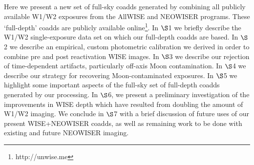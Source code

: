 \documentclass{emulateapj}
\begin{document}
Here we present a new set of full-sky coadds generated by
combining all publicly available W1/W2 exposures from the AllWISE and NEOWISER
programs. These `full-depth' coadds are publicly available 
online\footnote{http://unwise.me}. In $\S$1 we briefly describe the W1/W2 
single-exposure data set on which our full-depth coadds are based. In $\S$2
we describe an empirical, custom photometric calibration we derived in order 
to combine pre and post reactivation WISE images. In $\S$3 we describe our
rejection of time-dependent artifacts, particularly off-axis Moon 
contamination. In $\S$4 we describe our strategy for recovering 
Moon-contaminated exposures. In $\S$5 we highlight some important aspects 
of the full-sky set of full-depth coadds generated by our processing. In 
$\S$6, we present a preliminary investigation of the improvements in WISE 
depth which have resulted from doubling the amount of W1/W2 imaging. We 
conclude in $\S$7 with a brief discussion of future uses of our present 
WISE+NEOWISER coadds, as well as remaining work to be done with existing and 
future NEOWISER imaging.






\end{document}
